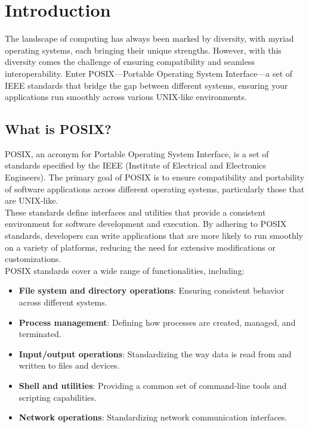 \section{Introduction}

The landscape of computing has always been marked by diversity, with myriad operating systems, each bringing their unique strengths. However, with this diversity comes the challenge of ensuring compatibility and seamless interoperability. Enter POSIX—Portable Operating System Interface—a set of IEEE standards that bridge the gap between different systems, ensuring your applications run smoothly across various UNIX-like environments.
\\
\subsection{What is POSIX?}

POSIX, an acronym for Portable Operating System Interface, is a set of standards specified by the IEEE (Institute of Electrical and Electronics Engineers). The primary goal of POSIX is to ensure compatibility and portability of software applications across different operating systems, particularly those that are UNIX-like.
\\
These standards define interfaces and utilities that provide a consistent environment for software development and execution. By adhering to POSIX standards, developers can write applications that are more likely to run smoothly on a variety of platforms, reducing the need for extensive modifications or customizations.
\\
POSIX standards cover a wide range of functionalities, including: 
\begin{itemize} \item \textbf{File system and directory operations}: Ensuring consistent behavior across different systems. 
    \item \textbf{Process management}: Defining how processes are created, managed, and terminated. 
    \item \textbf{Input/output operations}: Standardizing the way data is read from and written to files and devices. 
    \item \textbf{Shell and utilities}: Providing a common set of command-line tools and scripting capabilities. 
    \item \textbf{Network operations}: Standardizing network communication interfaces. 
\end{itemize}

